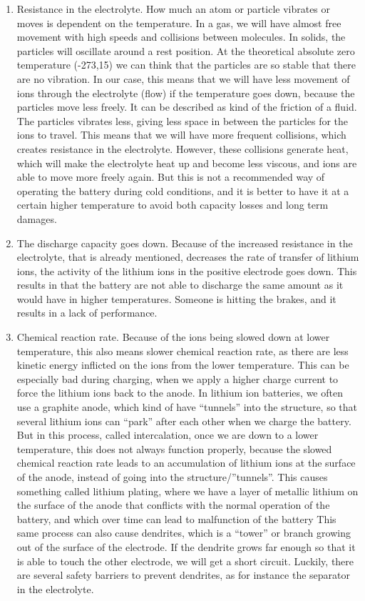 \documentclass{article}
\begin{document}
\begin{enumerate}
    \item  Resistance in the electrolyte. How much an atom or particle vibrates or moves is dependent on the temperature. In a gas, we will have almost free movement with high speeds and collisions between molecules. In solids, the particles will oscillate around a rest position. At the theoretical absolute zero temperature (-273,15) we can think that the particles are so stable that there are no vibration. In our case, this means that we will have less movement of ions through the electrolyte  (flow) if the temperature goes down, because the particles move less freely. It can be described as kind of the friction of a fluid. The particles vibrates less, giving less space in between the particles for the ions to travel. This means that we will have more frequent collisions, which creates resistance in the electrolyte. However, these collisions generate heat, which will make the electrolyte heat up and become less viscous, and ions are able to move more freely again. But this is not a recommended way of operating the battery during cold conditions, and it is better to have it at a certain higher temperature to avoid both capacity losses and long term damages.
    \item The discharge capacity goes down. Because of the increased resistance in the electrolyte, that is already mentioned, decreases the rate of transfer of lithium ions, the activity of the lithium ions in the positive electrode goes down. This results in that the battery are not able to discharge the same amount as it would have in higher temperatures. Someone is hitting the brakes, and it results in a lack of performance.
    \item Chemical reaction rate. Because of the ions being slowed down at lower temperature, this also means slower chemical reaction rate, as there are less kinetic energy inflicted on the ions from the lower temperature. This can be especially bad during charging, when we apply a higher charge current to force the lithium ions back to the anode. In lithium ion batteries, we often use a graphite anode, which kind of have “tunnels” into the structure, so that several lithium ions can “park” after each other when we charge the battery. But in this process, called intercalation, once we are down to a lower temperature, this does not always function properly, because the slowed chemical reaction rate leads to an accumulation of lithium ions at the surface of the anode, instead of going into the structure/”tunnels”. This causes something called lithium plating, where we have a layer of metallic lithium on the surface of the anode that conflicts with the normal operation of the battery, and which over time can lead to malfunction of the battery %
    This same process can also cause dendrites, which is a “tower” or branch growing out of the surface of the electrode. If the dendrite grows far enough so that it is able to touch the other electrode, we will get a short circuit. Luckily, there are several safety barriers to prevent dendrites, as for instance the separator in the electrolyte.
\end{enumerate}
\end{document}

